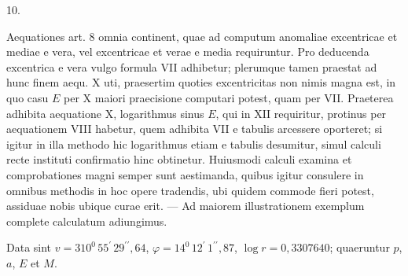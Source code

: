 \begin{center}
10.
\end{center}
Aequationes art. 8 omnia continent, quae ad computum anomaliae excentricae et mediae e vera, vel excentricae et verae e media requiruntur. Pro deducenda excentrica e vera vulgo formula VII adhibetur; plerumque tamen praestat ad hunc finem aequ. X uti, praesertim quoties excentricitas non nimis magna est, in quo casu $E$ per X maiori praecisione computari potest, quam per VII. Praeterea adhibita aequatione X, logarithmus sinus $E$, qui in XII requiritur, protinus per aequationem VIII habetur, quem adhibita VII e tabulis arcessere oporteret; si igitur in illa methodo hic logarithmus etiam e tabulis desumitur, simul calculi recte instituti confirmatio hinc obtinetur. Huiusmodi calculi examina et comprobationes magni semper sunt aestimanda, quibus igitur consulere in omnibus methodis in hoc opere tradendis, ubi quidem commode fieri potest, assiduae nobis ubique curae erit. — Ad maiorem illustrationem exemplum complete calculatum adiungimus.

Data sint $v = 310^0\,55^{\prime}\,29^{\prime\prime}{,}64$, $\varphi = 14^0\,12^{\prime}\,1^{\prime\prime}{,}87$, $\log r = 0{,}3307640$; quaeruntur $p$, $a$, $E$ et $M$.

